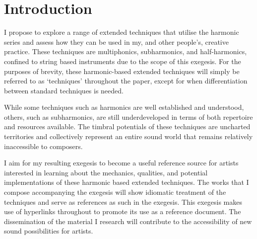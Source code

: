 \section{Introduction}


\doublespace{}

I propose to explore a range of extended techniques that utilise the harmonic series and assess how they can be used in my, and other people's, creative practice. 
These techniques are multiphonics, subharmonics, and half-harmonics, confined to string based instruments due to the scope of this exegesis.
For the purposes of brevity, these harmonic-based extended techniques will simply be referred to as `techniques' throughout the paper, except for when differentiation between standard techniques is needed.

While some techniques such as harmonics are well established and understood, others, such as subharmonics, are still underdeveloped in terms of both repertoire and resources available. 
The timbral potentials of these techniques are uncharted territories and collectively represent an entire sound world that remains relatively inaccessible to composers.


I aim for my resulting exegesis to become a useful reference source for artists interested in learning about the mechanics, qualities, and potential implementations of these harmonic based extended techniques. 
The works that I compose accompanying the exegesis will show idiomatic treatment of the techniques and serve as references as such in the exegesis.
This exegesis makes use of hyperlinks throughout to promote its use as a reference document. 
The dissemination of the material I research will contribute to the accessibility of new sound possibilities for artists.